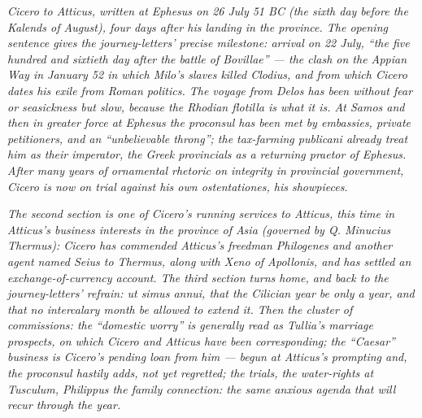 
\textit{Cicero to Atticus, written at Ephesus on 26 July 51 BC
(the sixth day before the Kalends of August), four days
after his landing in the province. The opening sentence
gives the journey-letters' precise milestone: arrival on
22 July, ``the five hundred and sixtieth day after the
battle of Bovillae'' --- the clash on the Appian Way in
January 52 in which Milo's slaves killed Clodius, and from
which Cicero dates his exile from Roman politics. The
voyage from Delos has been without fear or seasickness but
slow, because the Rhodian flotilla is what it is. At Samos
and then in greater force at Ephesus the proconsul has been
met by embassies, private petitioners, and an
``unbelievable throng''; the tax-farming \textit{publicani}
already treat him as their imperator, the Greek provincials
as a returning praetor of Ephesus. After many years of
ornamental rhetoric on integrity in provincial government,
Cicero is now on trial against his own \textit{ostentationes},
his showpieces.}

\textit{The second section is one of Cicero's running services
to Atticus, this time in Atticus's business interests in the
province of Asia (governed by Q. Minucius Thermus): Cicero
has commended Atticus's freedman Philogenes and another
agent named Seius to Thermus, along with Xeno of Apollonis,
and has settled an exchange-of-currency account. The third
section turns home, and back to the journey-letters' refrain:
\textit{ut simus annui}, that the Cilician year be only a
year, and that no intercalary month be allowed to extend it.
Then the cluster of commissions: the ``domestic worry'' is
generally read as Tullia's marriage prospects, on which
Cicero and Atticus have been corresponding; the ``Caesar''
business is Cicero's pending loan from him --- begun at
Atticus's prompting and, the proconsul hastily adds, not
yet regretted; the trials, the water-rights at Tusculum,
Philippus the family connection: the same anxious agenda
that will recur through the year.}
